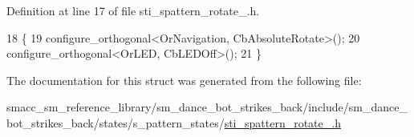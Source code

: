 Definition at line 17 of file sti\+\_\+spattern\+\_\+rotate\+\_.\+h.


\begin{DoxyCode}
18     \{
19         configure\_orthogonal<OrNavigation, CbAbsoluteRotate>();
20         configure\_orthogonal<OrLED, CbLEDOff>();
21     \}
\end{DoxyCode}


The documentation for this struct was generated from the following file\+:\begin{DoxyCompactItemize}
\item 
smacc\+\_\+sm\+\_\+reference\+\_\+library/sm\+\_\+dance\+\_\+bot\+\_\+strikes\+\_\+back/include/sm\+\_\+dance\+\_\+bot\+\_\+strikes\+\_\+back/states/s\+\_\+pattern\+\_\+states/\hyperlink{strikes__back_2include_2sm__dance__bot__strikes__back_2states_2s__pattern__states_2sti__spattern__rotate__3_8h}{sti\+\_\+spattern\+\_\+rotate\+\_.\+h}\end{DoxyCompactItemize}
